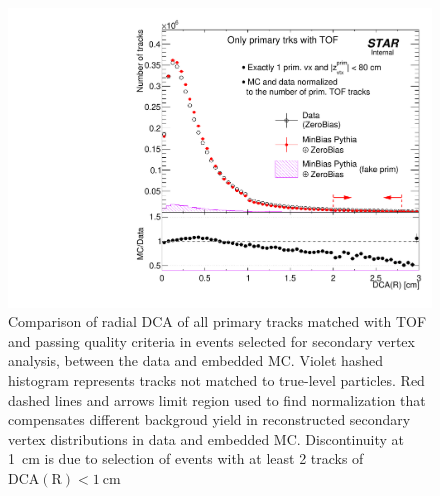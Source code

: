\begin{figure}[t!]
\begin{minipage}{.4725\textwidth}
  \includegraphics[width=\linewidth]{graphics/deadMaterial/DcaRPrimary_Tof_SelectedEvents_DataVsMC.pdf}\vspace*{-5pt}
  \caption[Comparison of radial DCA of all primary tracks matched with TOF and passing quality criteria in events selected for secondary vertex analysis, between the data and embedded MC.]
   {Comparison of radial DCA of all primary tracks matched with TOF and passing quality criteria in events selected for secondary vertex analysis, between the data and embedded MC. Violet hashed histogram represents tracks not matched to true-level particles. Red dashed lines and arrows limit region used to find normalization that compensates different backgroud yield in reconstructed secondary vertex distributions in data and embedded MC. Discontinuity at 1~cm is due to selection of events with at least 2 tracks of $\text{DCA}(\text{R})<1~\text{cm}$}
   \label{fig:primaryDcaSelectedEvtsDataVsMC}%
\end{minipage}\vspace{-12pt}%
\end{figure}%
%
